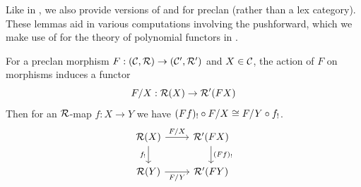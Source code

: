 Like in \cite[Lemma 2.4.13]{joyal2017},
we also provide versions of 
and 
for preclan (rather than a lex category).
These lemmas aid in various computations
involving the pushforward,
which we make use of for the theory of polynomial functors in .

For a preclan morphism $F : (\mathcal{C}, \mathcal{R}) \to (\mathcal{C}',\mathcal{R}')$
and $X \in \mathcal{C}$,
the action of $F$ on morphisms induces a functor
\[F / X : \mathcal{R}(X) \to \mathcal{R}'(F X)\]
Then for an $\mathcal{R}$-map $f : X \to Y$
we have $(F f)_! \circ F / X \cong F / Y \circ f_!$.
\[
  \begin{tikzcd}
    {\RR(X)} & {\RR'(F X)} \\
    {\RR(Y)} & {\RR'(F Y)}
    \arrow["{F / X}", from=1-1, to=1-2]
    \arrow["{f_!}"', from=1-1, to=2-1]
    \arrow["{(F f)_!}", from=1-2, to=2-2]
    \arrow["F / Y"', from=2-1, to=2-2]
  \end{tikzcd}
\]


